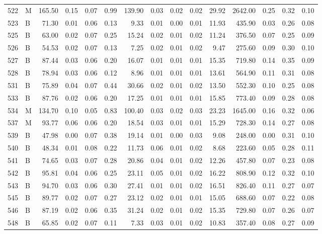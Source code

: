 \begin{table}[ht]
\begin{tabular}{rlrrrrrrrrrrrrr}
  522 & M & 165.50 & 0.15 & 0.07 & 0.99 & 139.90 & 0.03 & 0.02 & 0.02 & 29.92 & 2642.00 & 0.25 & 0.32 & 0.10 \\ 
  523 & B & 71.30 & 0.01 & 0.06 & 0.13 & 9.33 & 0.01 & 0.00 & 0.01 & 11.93 & 435.90 & 0.03 & 0.26 & 0.08 \\ 
  525 & B & 63.00 & 0.02 & 0.07 & 0.25 & 15.24 & 0.02 & 0.01 & 0.02 & 11.24 & 376.50 & 0.07 & 0.25 & 0.09 \\ 
  526 & B & 54.53 & 0.02 & 0.07 & 0.13 & 7.25 & 0.02 & 0.01 & 0.02 & 9.47 & 275.60 & 0.09 & 0.30 & 0.10 \\ 
  527 & B & 87.44 & 0.03 & 0.06 & 0.20 & 16.07 & 0.01 & 0.01 & 0.01 & 15.35 & 719.80 & 0.14 & 0.35 & 0.09 \\ 
  528 & B & 78.94 & 0.03 & 0.06 & 0.12 & 8.96 & 0.01 & 0.01 & 0.01 & 13.61 & 564.90 & 0.11 & 0.31 & 0.08 \\ 
  531 & B & 75.89 & 0.04 & 0.07 & 0.44 & 30.66 & 0.02 & 0.01 & 0.02 & 13.50 & 552.30 & 0.10 & 0.25 & 0.08 \\ 
  533 & B & 87.76 & 0.02 & 0.06 & 0.20 & 17.25 & 0.01 & 0.01 & 0.01 & 15.85 & 773.40 & 0.09 & 0.28 & 0.08 \\ 
  534 & M & 134.70 & 0.10 & 0.05 & 0.83 & 100.40 & 0.03 & 0.02 & 0.03 & 23.23 & 1645.00 & 0.16 & 0.32 & 0.06 \\ 
  537 & M & 93.77 & 0.06 & 0.06 & 0.20 & 18.54 & 0.03 & 0.01 & 0.01 & 15.29 & 728.30 & 0.14 & 0.27 & 0.08 \\ 
  539 & B & 47.98 & 0.00 & 0.07 & 0.38 & 19.14 & 0.01 & 0.00 & 0.03 & 9.08 & 248.00 & 0.00 & 0.31 & 0.10 \\ 
  540 & B & 48.34 & 0.01 & 0.08 & 0.22 & 11.73 & 0.06 & 0.01 & 0.02 & 8.68 & 223.60 & 0.05 & 0.28 & 0.11 \\ 
  541 & B & 74.65 & 0.03 & 0.07 & 0.28 & 20.86 & 0.04 & 0.01 & 0.02 & 12.26 & 457.80 & 0.07 & 0.23 & 0.08 \\ 
  542 & B & 95.81 & 0.04 & 0.06 & 0.25 & 23.11 & 0.05 & 0.01 & 0.02 & 16.22 & 808.90 & 0.12 & 0.32 & 0.10 \\ 
  543 & B & 94.70 & 0.03 & 0.06 & 0.30 & 27.41 & 0.01 & 0.01 & 0.02 & 16.51 & 826.40 & 0.11 & 0.27 & 0.07 \\ 
  545 & B & 89.77 & 0.02 & 0.07 & 0.27 & 23.12 & 0.02 & 0.01 & 0.01 & 15.05 & 688.60 & 0.07 & 0.22 & 0.08 \\ 
  546 & B & 87.19 & 0.02 & 0.06 & 0.35 & 31.24 & 0.02 & 0.01 & 0.02 & 15.35 & 729.80 & 0.07 & 0.26 & 0.07 \\ 
  548 & B & 65.85 & 0.02 & 0.07 & 0.11 & 7.33 & 0.03 & 0.01 & 0.02 & 10.83 & 357.40 & 0.08 & 0.27 & 0.09 \\ 

\end{tabular}
\end{table}
